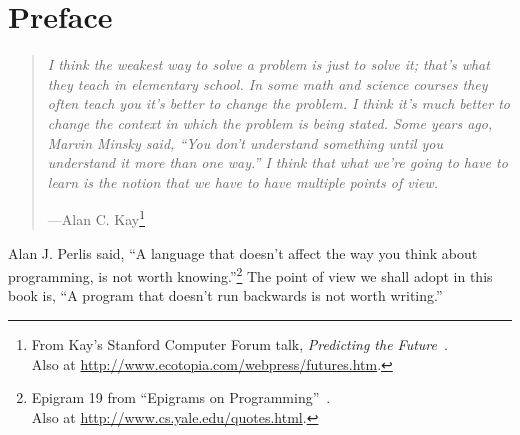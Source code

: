 \chapter{Preface}\label{sec:preface}

\vspace{-1cm}

\begin{quotation}
\noindent
\emph{I think the weakest way to solve a problem is just to solve it; that's what they teach in elementary school. In some math and science courses they often teach you it's better to change the problem. I think it's much better to change the context in which the problem is being stated. Some years ago, Marvin Minsky said, ``You don't understand something until you understand it more than one way.'' I think that what we're going to have to learn is the notion that we have to have multiple points of view.}
\begin{flushright}
\vspace{-0.5em}
---Alan C. Kay\footnote{From Kay's Stanford Computer Forum talk, \emph{Predicting the Future}~\cite{Kay:1989}.\\Also at \url{http://www.ecotopia.com/webpress/futures.htm}.}
\end{flushright}
\end{quotation}



Alan J. Perlis said, ``A language that doesn't affect the way you think about programming, is not worth knowing.''\footnote{Epigram 19 from ``Epigrams on Programming''~\cite{Perlis:1982:SFE:947955.1083808}.\\Also at \url{http://www.cs.yale.edu/quotes.html}.}
%
The point of view we shall adopt in this book is, ``A program that doesn't run backwards is not worth writing.''

%




